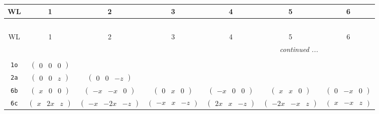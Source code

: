 \documentclass[fleqn,9pt,landscape]{jsarticle}
\begin{document}
\begin{center}
\renewcommand{\arraystretch}{1.2}
\begin{longtable}{ccccccc}
 \hline \hline
WL & 1 & 2 & 3 & 4 & 5 & 6 \\ \hline \endfirsthead

\multicolumn{6}{l}{\tablename\ \thetable{}} \\
 \hline \hline
WL & 1 & 2 & 3 & 4 & 5 & 6 \\ \hline \endhead

 \hline \hline
\multicolumn{6}{r}{\footnotesize\it continued ...} \\ \endfoot

 \hline \hline
\multicolumn{6}{r}{} \\ \endlastfoot

{\tt 1o} & $ \begin{pmatrix} 0 & 0 & 0 \end{pmatrix} $ & $  $ & $  $ & $  $ & $  $ & $  $ \\ \hline
{\tt 2a} & $ \begin{pmatrix} 0 & 0 & z \end{pmatrix} $ & $ \begin{pmatrix} 0 & 0 & - z \end{pmatrix} $ & $  $ & $  $ & $  $ & $  $ \\ \hline
{\tt 6b} & $ \begin{pmatrix} x & 0 & 0 \end{pmatrix} $ & $ \begin{pmatrix} - x & - x & 0 \end{pmatrix} $ & $ \begin{pmatrix} 0 & x & 0 \end{pmatrix} $ & $ \begin{pmatrix} - x & 0 & 0 \end{pmatrix} $ & $ \begin{pmatrix} x & x & 0 \end{pmatrix} $ & $ \begin{pmatrix} 0 & - x & 0 \end{pmatrix} $ \\ \hline
{\tt 6c} & $ \begin{pmatrix} x & 2 x & z \end{pmatrix} $ & $ \begin{pmatrix} - x & - 2 x & - z \end{pmatrix} $ & $ \begin{pmatrix} - x & x & - z \end{pmatrix} $ & $ \begin{pmatrix} 2 x & x & - z \end{pmatrix} $ & $ \begin{pmatrix} - 2 x & - x & z \end{pmatrix} $ & $ \begin{pmatrix} x & - x & z \end{pmatrix} $ \\ \hline

\end{longtable}
\end{center}
\end{document}
